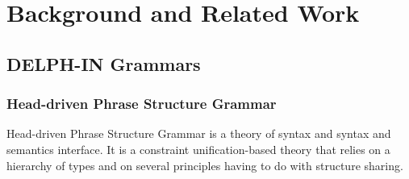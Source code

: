 \documentclass [11pt, proquest] {uwthesis}[2016/11/22]
\begin{document}

\chapter{Background and Related Work}


\section{DELPH-IN Grammars}


\subsection{Head-driven Phrase Structure Grammar}


Head-driven Phrase Structure Grammar \citep[HPSG;][]{Pol:Sag:94} is a theory of syntax and syntax and semantics interface. It is a constraint unification-based theory that relies on a hierarchy of types and on several principles having to do with structure sharing.


%
%
\end{document}
